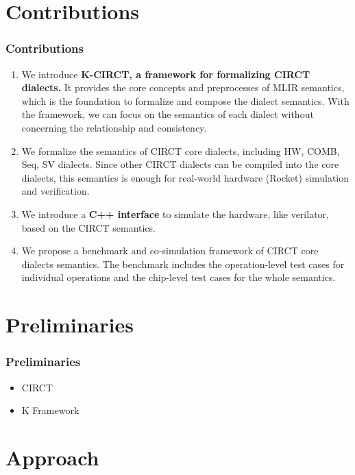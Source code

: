 \documentclass{beamer}
\begin{document}
\section{Contributions}

\begin{frame}
    \frametitle{Contributions}
    \begin{enumerate}
        \item We introduce \textbf{K-CIRCT, a framework for formalizing CIRCT dialects.} It provides the core concepts and preprocesses of MLIR semantics, which is the foundation to formalize and compose the dialect semantics. With the framework, we can focus on the semantics of each dialect without concerning the relationship and consistency.
        \item We formalize the semantics of CIRCT core dialects, including HW, COMB, Seq, SV dialects. Since other CIRCT dialects can be compiled into the core dialects, this semantics is enough for real-world hardware (Rocket) simulation and verification.
        \item We introduce a \textbf{C++ interface} to simulate the hardware, like verilator, based on the CIRCT semantics. 
        \item We propose a benchmark and co-simulation framework of CIRCT core dialects semantics. The benchmark includes the operation-level test cases for individual operations and the chip-level test cases for the whole semantics.
    \end{enumerate}
\end{frame}

\section{Preliminaries}
\begin{frame}
    \frametitle{Preliminaries}
    \begin{itemize}
        \item CIRCT
        \item K Framework
    \end{itemize}
\end{frame}

\section{Approach}
\end{document}

